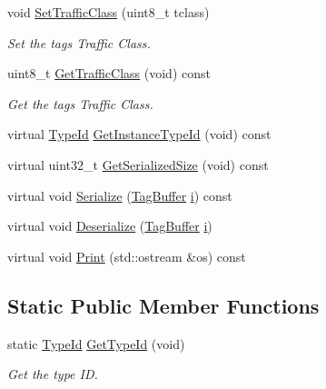 \begin{DoxyCompactItemize}
void \hyperlink{classns3_1_1Ipv6PacketInfoTag_a0499ba3f42d0b03105d029c0d4404bcb}{Set\+Traffic\+Class} (uint8\+\_\+t tclass)
\begin{DoxyCompactList}\small\item\em Set the tag\textquotesingle{}s Traffic Class. \end{DoxyCompactList}\item 
uint8\+\_\+t \hyperlink{classns3_1_1Ipv6PacketInfoTag_ac8045ef20df25e846b9a5ca27f19ddeb}{Get\+Traffic\+Class} (void) const 
\begin{DoxyCompactList}\small\item\em Get the tag\textquotesingle{}s Traffic Class. \end{DoxyCompactList}\item 
virtual \hyperlink{classns3_1_1TypeId}{Type\+Id} \hyperlink{classns3_1_1Ipv6PacketInfoTag_acd747f4f586b4363c5fde4add642a93c}{Get\+Instance\+Type\+Id} (void) const 
\item 
virtual uint32\+\_\+t \hyperlink{classns3_1_1Ipv6PacketInfoTag_a1dafa9b824ac0a4a36cffb4ab571d375}{Get\+Serialized\+Size} (void) const 
\item 
virtual void \hyperlink{classns3_1_1Ipv6PacketInfoTag_af423cffa224241b015fa2bd9b12e1853}{Serialize} (\hyperlink{classns3_1_1TagBuffer}{Tag\+Buffer} \hyperlink{lte__uplink__power__control_8m_a6f6ccfcf58b31cb6412107d9d5281426}{i}) const 
\item 
virtual void \hyperlink{classns3_1_1Ipv6PacketInfoTag_ae9289d0e1dd8c8a59752c2b1eda1c4d4}{Deserialize} (\hyperlink{classns3_1_1TagBuffer}{Tag\+Buffer} \hyperlink{lte__uplink__power__control_8m_a6f6ccfcf58b31cb6412107d9d5281426}{i})
\item 
virtual void \hyperlink{classns3_1_1Ipv6PacketInfoTag_a3fbcd470aa1ef4739e9211e5b142d6d8}{Print} (std\+::ostream \&os) const 
\end{DoxyCompactItemize}
\subsection*{Static Public Member Functions}
\begin{DoxyCompactItemize}
\item 
static \hyperlink{classns3_1_1TypeId}{Type\+Id} \hyperlink{classns3_1_1Ipv6PacketInfoTag_aa640c01b45982b98d179afcf7c29b36a}{Get\+Type\+Id} (void)
\begin{DoxyCompactList}\small\item\em Get the type ID. \end{DoxyCompactList}\end{DoxyCompactItemize}
